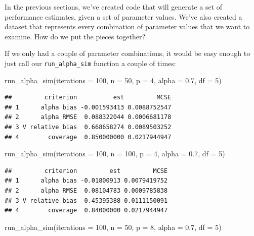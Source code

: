 \documentclass[
]{book}
\newenvironment{Shaded}{\begin{snugshade}}{\end{snugshade}}
\newcommand{\AttributeTok}[1]{\textcolor[rgb]{0.77,0.63,0.00}{#1}}
\newcommand{\DecValTok}[1]{\textcolor[rgb]{0.00,0.00,0.81}{#1}}
\newcommand{\FloatTok}[1]{\textcolor[rgb]{0.00,0.00,0.81}{#1}}
\newcommand{\FunctionTok}[1]{\textcolor[rgb]{0.00,0.00,0.00}{#1}}
\newcommand{\NormalTok}[1]{#1}
\begin{document}
In the previous sections, we've created code that will generate a set of performance estimates, given a set of parameter values. We've also created a dataset that represents every combination of parameter values that we want to examine. How do we put the pieces together?

If we only had a couple of parameter combinations, it would be easy enough to just call our \texttt{run\_alpha\_sim} function a couple of times:

\begin{Shaded}
\begin{Highlighting}[]
\FunctionTok{run\_alpha\_sim}\NormalTok{(}\AttributeTok{iterations =} \DecValTok{100}\NormalTok{, }\AttributeTok{n =} \DecValTok{50}\NormalTok{, }\AttributeTok{p =} \DecValTok{4}\NormalTok{, }\AttributeTok{alpha =} \FloatTok{0.7}\NormalTok{, }\AttributeTok{df =} \DecValTok{5}\NormalTok{)}
\end{Highlighting}
\end{Shaded}

\begin{verbatim}
##         criterion          est         MCSE
## 1      alpha bias -0.001593413 0.0088752547
## 2      alpha RMSE  0.088322044 0.0006681178
## 3 V relative bias  0.668658274 0.0089503252
## 4        coverage  0.850000000 0.0217944947
\end{verbatim}

\begin{Shaded}
\begin{Highlighting}[]
\FunctionTok{run\_alpha\_sim}\NormalTok{(}\AttributeTok{iterations =} \DecValTok{100}\NormalTok{, }\AttributeTok{n =} \DecValTok{100}\NormalTok{, }\AttributeTok{p =} \DecValTok{4}\NormalTok{, }\AttributeTok{alpha =} \FloatTok{0.7}\NormalTok{, }\AttributeTok{df =} \DecValTok{5}\NormalTok{)}
\end{Highlighting}
\end{Shaded}

\begin{verbatim}
##         criterion         est         MCSE
## 1      alpha bias -0.01800913 0.0079419752
## 2      alpha RMSE  0.08104783 0.0009785838
## 3 V relative bias  0.45395388 0.0111150091
## 4        coverage  0.84000000 0.0217944947
\end{verbatim}

\begin{Shaded}
\begin{Highlighting}[]
\FunctionTok{run\_alpha\_sim}\NormalTok{(}\AttributeTok{iterations =} \DecValTok{100}\NormalTok{, }\AttributeTok{n =} \DecValTok{50}\NormalTok{, }\AttributeTok{p =} \DecValTok{8}\NormalTok{, }\AttributeTok{alpha =} \FloatTok{0.7}\NormalTok{, }\AttributeTok{df =} \DecValTok{5}\NormalTok{)}
\end{Highlighting}
\end{Shaded}
\end{document}
